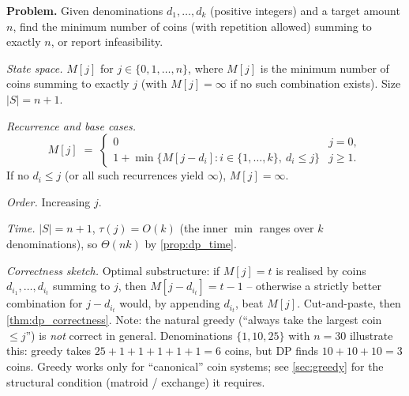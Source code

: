 \begin{example}
\label{ex:coin_change}
\textbf{Problem.} Given denominations $d_1, \dots, d_k$ (positive integers) and a target amount $n$, find the minimum number of coins (with repetition allowed) summing to exactly $n$, or report infeasibility.

\medskip
\noindent\textit{State space.} $M[j]$ for $j \in \{0, 1, \dots, n\}$, where $M[j]$ is the minimum number of coins summing to exactly $j$ (with $M[j] = \infty$ if no such combination exists). Size $|S| = n+1$.

\medskip
\noindent\textit{Recurrence and base cases.}
\[
  M[j] \;=\; \begin{cases}
    0 & j = 0, \\
    1 + \min\bigl\{M[j - d_i] : i \in \{1, \dots, k\},\ d_i \le j\bigr\} & j \ge 1.
  \end{cases}
\]
If no $d_i \le j$ (or all such recurrences yield $\infty$), $M[j] = \infty$.

\medskip
\noindent\textit{Order.} Increasing $j$.

\medskip
\noindent\textit{Time.} $|S| = n+1$, $\tau(j) = O(k)$ (the inner $\min$ ranges over $k$ denominations), so $\Theta(nk)$ by \cref{prop:dp_time}.

\medskip
\noindent\textit{Correctness sketch.} Optimal substructure: if $M[j] = t$ is realised by coins $d_{i_1}, \dots, d_{i_t}$ summing to $j$, then $M[j - d_{i_t}] = t - 1$ -- otherwise a strictly better combination for $j - d_{i_t}$ would, by appending $d_{i_t}$, beat $M[j]$. Cut-and-paste, then \cref{thm:dp_correctness}. Note: the natural greedy (``always take the largest coin $\le j$'') is \emph{not} correct in general. Denominations $\{1, 10, 25\}$ with $n = 30$ illustrate this: greedy takes $25 + 1 + 1 + 1 + 1 + 1 = 6$ coins, but DP finds $10 + 10 + 10 = 3$ coins. Greedy works only for ``canonical'' coin systems; see \cref{sec:greedy} for the structural condition (matroid / exchange) it requires.
\end{example}

